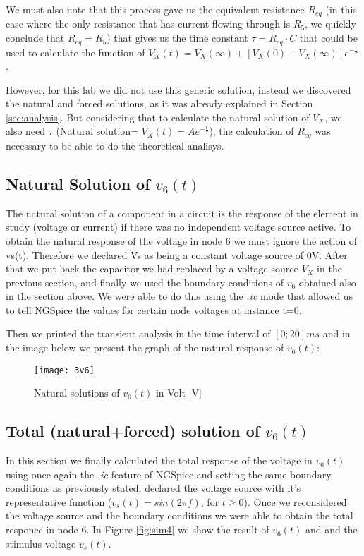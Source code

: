 We must also note that this process gave us the equivalent resistance $R_{eq}$ (in this case where the only resistance that has current flowing through is $R_5$, we quickly conclude that $R_{eq}=R_5$) that gives us the time constant $\tau=R_{eq}\cdot C$ that could be used to calculate the function of $V_X(t)=V_X(\infty)+[V_X(0)-V_X(\infty)]e^{-\frac{t}{\tau}}$.\par 
However, for this lab we did not use this generic solution, instead we discovered the natural and forced solutions, as it was already explained in Section \ref{sec:analysis}. But considering that to calculate the natural solution of $V_X$, we also need $\tau$ (Natural solution= $V_X(t)=Ae^{-\frac{t}{\tau}}$), the calculation of $R_{eq}$ was necessary to be able to do the theoretical analisys.\par

\subsection{Natural Solution of $v_6(t)$}
\label{sec:sim3}
The natural solution of a component in a circuit is the response of the element in study (voltage or current) if there was no independent voltage source active. To obtain the natural response of the voltage in node 6 we must ignore the action of vs(t). Therefore we declared Vs as being a constant voltage source of 0V. After that we put back the capacitor we had replaced by a voltage source $V_X$ in the previous section, and finally we used the boundary conditions of $v_6$ obtained also in the section above. We were able to do this using the \textit{.ic} mode that allowed us to tell NGSpice the values for certain node voltages at instance t=0.\par
Then we printed the transient analysis in the time interval of $[0; 20]ms$ and in the image below we present the graph of the natural response of $v_6(t)$:
\FloatBarrier
\begin{figure}[h] \centering
	\texttt{[image: 3v6]}
	\caption{Natural solutions of $v_6(t)$ in Volt [V]}
	\label{fig:sim3}
\end{figure}
\FloatBarrier

\subsection{Total (natural+forced) solution of $v_6(t)$}
\label{sec:sim4}
In this section we finally calculated the total response of the voltage in $v_6(t)$ using once again the \textit{.ic} feature of NGSpice and setting the same boundary conditions as previously stated, declared the voltage source with it's representative function ($v_s(t)=sin(2\pi f)$, for $t\geq 0$). Once we reconsidered the voltage source and the boundary conditions we were able to obtain the total responce in node 6. In Figure \ref{fig:sim4} we show the result of $v_6(t)$ and and the stimulus voltage $v_s(t)$.\par 


